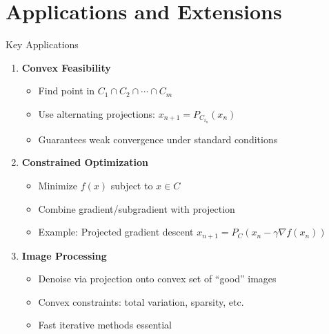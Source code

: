 \documentclass[aspectratio=169,10pt]{beamer}
\begin{document}
\section{Applications and Extensions}

\begin{frame}{Key Applications}

    \begin{enumerate}
        \item[\textbf{1}] \textbf{Convex Feasibility}
        \begin{itemize}
            \item Find point in $C_1 \cap C_2 \cap \cdots \cap C_m$
            \item Use alternating projections: $x_{n+1} = P_{C_{i_n}}(x_n)$
            \item Guarantees weak convergence under standard conditions
        \end{itemize}

        \vspace{0.3cm}

        \item[\textbf{2}] \textbf{Constrained Optimization}
        \begin{itemize}
            \item Minimize $f(x)$ subject to $x \in C$
            \item Combine gradient/subgradient with projection
            \item Example: Projected gradient descent $x_{n+1} = P_C(x_n - \gamma \nabla f(x_n))$
        \end{itemize}

        \vspace{0.3cm}

        \item[\textbf{3}] \textbf{Image Processing}
        \begin{itemize}
            \item Denoise via projection onto convex set of ``good'' images
            \item Convex constraints: total variation, sparsity, etc.
            \item Fast iterative methods essential
        \end{itemize}

        \vspace{0.3cm}


\end{enumerate}
\end{frame}
\end{document}
